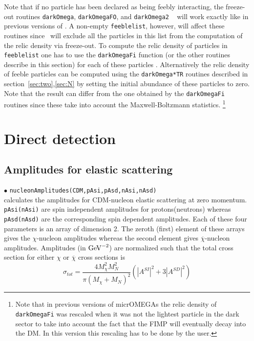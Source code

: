 \documentclass[12pt,a4paper]{article}
\begin{document}
Note that if no particle has been declared as being feebly interacting, the freeze-out routines \verb|darkOmega|, \verb|darkOmegaFO|, and \verb|darkOmega2| ~\cite{Belanger:2014vza} will work exactly like in previous versions of \micro. A non-empty \verb|feeblelist|, however, will affect these routines since \micro~will exclude all
 the particles in this list from the computation of the relic density via freeze-out. 
 To compute the relic density of particles in  \verb|feeblelist| one has to use the {\tt darkOmegaFi} function (or the other routines describe in this section) for each of these particles . Alternatively the relic density of feeble particles can be computed using the {\tt darkOmega*TR} routines described in
section~\ref{sec:two},\ref{sec:N} by setting the initial abundance of these particles to  zero. Note that the result can differ from  the one obtained by the {\tt darkOmegaFi} routines since these  take into account the
Maxwell-Boltzmann statistics. \footnote{Note that in previous versions of micrOMEGAs the relic density  of {\tt darkOmegaFi} was rescaled when it was not the lightest particle in the dark sector to take into account the fact that the FIMP will eventually decay into the DM. In this version this rescaling has to be done by the user.}


 



\section{Direct detection}
\subsection{Amplitudes for elastic scattering}
\noindent
 $\bullet$ \verb|nucleonAmplitudes(CDM,pAsi,pAsd,nAsi,nAsd)|\\
calculates the amplitudes for CDM-nucleon elastic
scattering at zero momentum. \verb|pAsi(nAsi)| are spin
independent amplitudes for protons(neutrons) whereas
\verb|pAsd(nAsd)| are the corresponding spin dependent amplitudes.
Each of these four parameters is an array of 
dimension 2. The zeroth (first) element of these arrays gives the
$\chi$-nucleon amplitudes whereas the second element gives
$\overline{\chi}$-nucleon amplitudes. Amplitudes (in ${\rm GeV}^{-2}$) are normalized
such that the total cross section for either $\chi$ or $\overline
\chi$ cross sections is
\begin{equation}
\sigma_{tot}=\frac{4M_{\chi}^2 M_N^2}{\pi(M_{\chi}+M_N)^2}(|A^{SI}|^2+3|A^{SD}|^2)
\label{eq:norm}
\end{equation}
\end{document}
